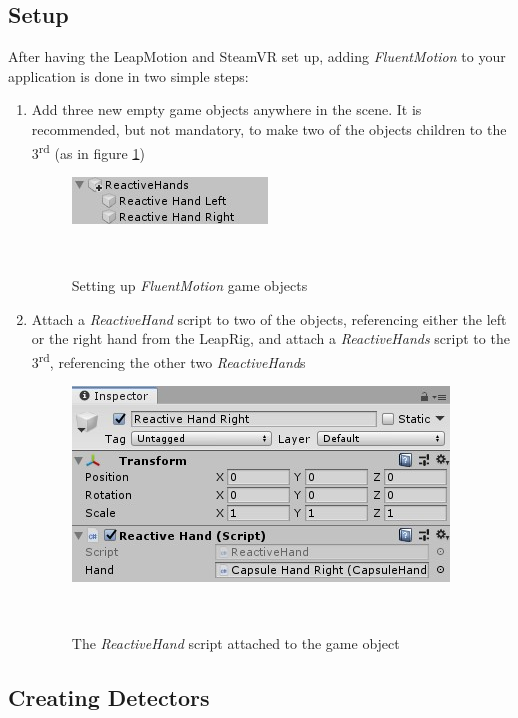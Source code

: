 \documentclass{sigchi}
\def\fluentmotion{\textit{FluentMotion}}
\def\leap{LeapMotion}
\def\steamvr{SteamVR}
\begin{document}
\subsection{Setup}
After having the \leap{} and \steamvr{} set up, adding \fluentmotion{} to your application is done in two simple steps:

\begin{enumerate}
  \item Add three new empty game objects anywhere in the scene. It is recommended, but not mandatory, to make two of the objects children to the 3\textsuperscript{rd} (as in figure \ref{fig:figure5})
  \begin{figure}[H]
    \centering
    \includegraphics[width=0.9\columnwidth]{figures/FluentMotion_setup}
    \caption{Setting up \fluentmotion{} game objects}~\label{fig:figure5}
  \end{figure}

  \item Attach a \textit{ReactiveHand} script to two of the objects, referencing either the left or the right hand from the LeapRig, and attach a \textit{ReactiveHands} script to the 3\textsuperscript{rd}, referencing the other two \textit{ReactiveHand}s
  \begin{figure}[h]
    \centering
    \includegraphics[width=0.9\columnwidth]{figures/FluentMotion_reactive_hand}
    \caption{The \textit{ReactiveHand} script attached to the game object}~\label{fig:figure6}
  \end{figure}
\end{enumerate}

\subsection{Creating Detectors}
\end{document}
